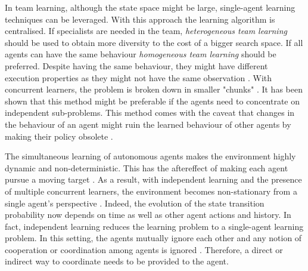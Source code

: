 In team learning, although the state space might be large, single-agent learning techniques can be leveraged. With this approach the learning algorithm is centralised. If specialists are needed in the team, \textit{heterogeneous team learning} should be used to obtain more diversity to the cost of a bigger search space. If all agents can have the same behaviour \textit{homogeneous team learning} should be preferred. Despite having the same behaviour, they might have different execution properties as they might not have the same observation \cite{panait_cooperative_2005}. With concurrent learners, the problem is broken down in smaller "chunks" \cite{jansen_exploring_2003}. It has been shown that this method might be preferable if the agents need to concentrate on independent sub-problems. This method comes with the caveat that changes in the behaviour of an agent might ruin the learned behaviour of other agents by making their policy obsolete \cite{panait_cooperative_2005}. 

The simultaneous learning of autonomous agents makes the environment highly dynamic and non-deterministic. This has the aftereffect of making each agent pursue a moving target \cite{bloembergen_evolutionary_2015, busoniu_comprehensive_2008}. As a result, with independent learning and the presence of multiple concurrent learners, the environment becomes non-stationary from a single agent's perspective \cite{panait_cooperative_2005, busoniu_comprehensive_2008}. Indeed, the evolution of the state transition probability now depends on time as well as other agent actions and history. In fact, independent learning reduces the learning problem to a single-agent learning problem. In this setting, the agents mutually ignore each other and any notion of cooperation or coordination among agents is ignored \cite{bloembergen_evolutionary_2015}. Therefore, a direct or indirect way to coordinate needs to be provided to the agent\cite{busoniu_multi-agent_2010}. 
 



